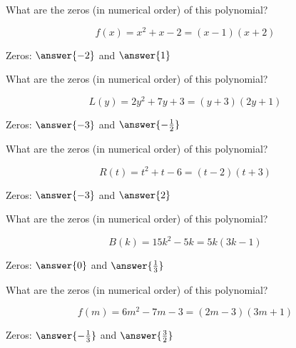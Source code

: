\documentclass{ximera}
\author{Lee Wayand}
\begin{document}
\begin{example}








\begin{question}


What are the zeros (in numerical order) of this polynomial?

\[
f(x) = x^2 + x - 2 = (x-1)(x+2)
\]


Zeros:  $\answer{-2}$ and $\answer{1}$

\end{question}





\begin{question}


What are the zeros (in numerical order) of this polynomial?

\[
L(y) = 2y^2 + 7y + 3 = (y+3)(2y+1)
\]

Zeros:  $\answer{-3}$ and $\answer{-\frac{1}{2}}$

\end{question}





\begin{question}


What are the zeros (in numerical order) of this polynomial?

\[
R(t) = t^2 + t - 6 = (t-2)(t+3)
\]

Zeros:  $\answer{-3}$ and $\answer{2}$

\end{question}





\begin{question}


What are the zeros (in numerical order) of this polynomial?

\[
B(k) = 15k^2 - 5k = 5k (3k - 1)
\]

Zeros:  $\answer{0}$ and $\answer{\frac{1}{3}}$

\end{question}








\begin{question}


What are the zeros (in numerical order) of this polynomial?

\[
f(m) = 6m^2 -7m - 3 = (2m - 3)(3m + 1)
\]

Zeros:  $\answer{-\frac{1}{3}}$ and $\answer{\frac{3}{2}}$

\end{question}












\end{example}
\end{document}
